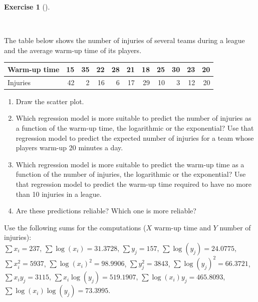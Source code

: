 \documentclass[
  a4paper,
]{scrreport}
\theoremstyle{definition}
\newtheorem{exercise}{Exercise}[chapter]
\theoremstyle{remark}
\begin{document}
\leavevmode{}%
\begin{exercise}[]\label{exr-2}

~

The table below shows the number of injuries of several teams during a
league and the average warm-up time of its players.

\begin{table}
\centering
\begin{tabular}{l|r|r|r|r|r|r|r|r|r|r}
\hline
Warm-up time & 15 & 35 & 22 & 28 & 21 & 18 & 25 & 30 & 23 & 20\\
\hline
Injuries & 42 & 2 & 16 & 6 & 17 & 29 & 10 & 3 & 12 & 20\\
\hline
\end{tabular}
\end{table}

\begin{enumerate}
\def\labelenumi{\alph{enumi}.}
\item
  Draw the scatter plot.
\item
  Which regression model is more suitable to predict the number of
  injuries as a function of the warm-up time, the logarithmic or the
  exponential? Use that regression model to predict the expected number
  of injuries for a team whose players warm-up 20 minutes a day.
\item
  Which regression model is more suitable to predict the warm-up time as
  a function of the number of injuries, the logarithmic or the
  exponential? Use that regression model to predict the warm-up time
  required to have no more than 10 injuries in a league.
\item
  Are these predictions reliable? Which one is more reliable?
\end{enumerate}

Use the following sums for the computations (\(X\) warm-up time and
\(Y\) number of injuries):\\
\(\sum x_i=237\), \(\sum \log(x_i)=31.3728\), \(\sum y_j=157\),
\(\sum \log(y_j)=24.0775\),\\
\(\sum x_i^2=5937\), \(\sum \log(x_i)^2=98.9906\), \(\sum y_j^2=3843\),
\(\sum \log(y_j)^2=66.3721\),\\
\(\sum x_iy_j=3115\), \(\sum x_i\log(y_j)=519.1907\),
\(\sum \log(x_i)y_j=465.8093\), \(\sum \log(x_i)\log(y_j)=73.3995\).

\end{exercise}
\end{document}
